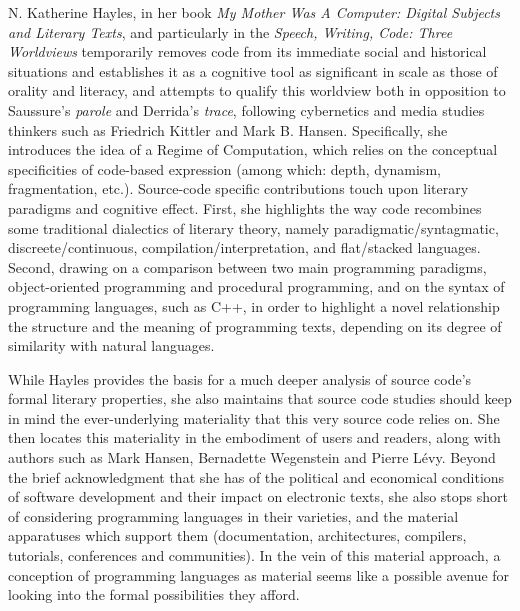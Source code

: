 N. Katherine Hayles, in her book \emph{My Mother Was A Computer: Digital Subjects and Literary Texts}\cite{hayles_my_2010}, and particularly in the \emph{Speech, Writing, Code: Three Worldviews} temporarily removes code from its immediate social and historical situations and establishes it as a cognitive tool as significant in scale as those of orality and literacy\cite{ong_orality_2012}, and attempts to qualify this worldview both in opposition to Saussure's \emph{parole} and Derrida's \emph{trace}, following cybernetics and media studies thinkers such as Friedrich Kittler and Mark B. Hansen. Specifically, she introduces the idea of a Regime of Computation, which relies on the conceptual specificities of code-based expression (among which: depth, dynamism, fragmentation, etc.). Source-code specific contributions touch upon literary paradigms and cognitive effect. First, she highlights the way code recombines some traditional dialectics of literary theory, namely paradigmatic/syntagmatic, discreete/continuous, compilation/interpretation, and flat/stacked languages. Second, drawing on a comparison between two main programming paradigms, object-oriented programming and procedural programming, and on the syntax of programming languages, such as C++, in order to highlight a novel relationship the structure and the meaning of programming texts, depending on its degree of similarity with natural languages.

While Hayles provides the basis for a much deeper analysis of source code's formal literary properties, she also maintains that source code studies should keep in mind the ever-underlying materiality that this very source code relies on. She then locates this materiality in the embodiment of users and readers, along with authors such as Mark Hansen\cite{hansen_bodies_2006}, Bernadette Wegenstein\cite{wegenstein_bodies_2010} and Pierre Lévy\cite{levy_programmation_1992}. Beyond the brief acknowledgment that she has of the political and economical conditions of software development and their impact on electronic texts, she also stops short of considering programming languages in their varieties, and the material apparatuses which support them (documentation, architectures, compilers, tutorials, conferences and communities). In the vein of this material approach, a conception of programming languages as material seems like a possible avenue for looking into the formal possibilities they afford.

